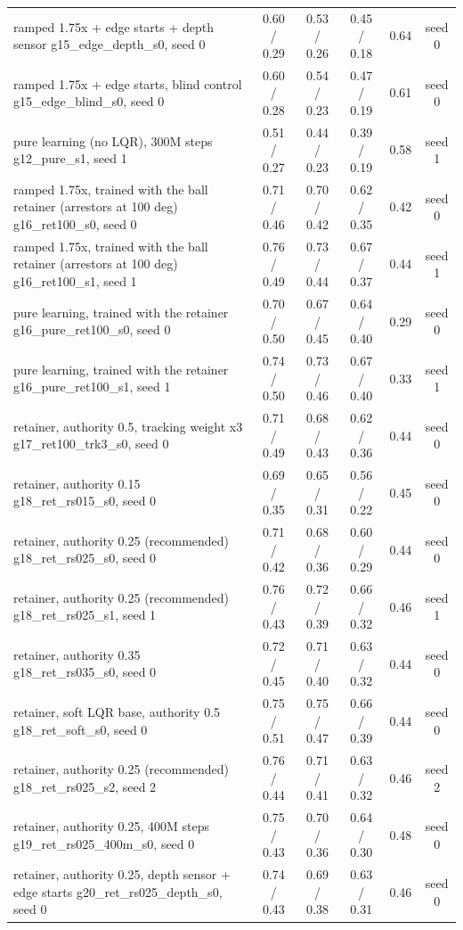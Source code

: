 \begin{table}[t]
{\begin{tabular}{lccccc}
ramped 1.75x + edge starts + depth sensor g15\_edge\_depth\_s0, seed 0 & 0.60 / 0.29 & 0.53 / 0.26 & 0.45 / 0.18 & 0.64 & seed 0\\
ramped 1.75x + edge starts, blind control g15\_edge\_blind\_s0, seed 0 & 0.60 / 0.28 & 0.54 / 0.23 & 0.47 / 0.19 & 0.61 & seed 0\\
pure learning (no LQR), 300M steps g12\_pure\_s1, seed 1 & 0.51 / 0.27 & 0.44 / 0.23 & 0.39 / 0.19 & 0.58 & seed 1\\
ramped 1.75x, trained with the ball retainer (arrestors at 100 deg) g16\_ret100\_s0, seed 0 & 0.71 / 0.46 & 0.70 / 0.42 & 0.62 / 0.35 & 0.42 & seed 0\\
ramped 1.75x, trained with the ball retainer (arrestors at 100 deg) g16\_ret100\_s1, seed 1 & 0.76 / 0.49 & 0.73 / 0.44 & 0.67 / 0.37 & 0.44 & seed 1\\
pure learning, trained with the retainer g16\_pure\_ret100\_s0, seed 0 & 0.70 / 0.50 & 0.67 / 0.45 & 0.64 / 0.40 & 0.29 & seed 0\\
pure learning, trained with the retainer g16\_pure\_ret100\_s1, seed 1 & 0.74 / 0.50 & 0.73 / 0.46 & 0.67 / 0.40 & 0.33 & seed 1\\
retainer, authority 0.5, tracking weight x3 g17\_ret100\_trk3\_s0, seed 0 & 0.71 / 0.49 & 0.68 / 0.43 & 0.62 / 0.36 & 0.44 & seed 0\\
retainer, authority 0.15 g18\_ret\_rs015\_s0, seed 0 & 0.69 / 0.35 & 0.65 / 0.31 & 0.56 / 0.22 & 0.45 & seed 0\\
retainer, authority 0.25 (recommended) g18\_ret\_rs025\_s0, seed 0 & 0.71 / 0.42 & 0.68 / 0.36 & 0.60 / 0.29 & 0.44 & seed 0\\
retainer, authority 0.25 (recommended) g18\_ret\_rs025\_s1, seed 1 & 0.76 / 0.43 & 0.72 / 0.39 & 0.66 / 0.32 & 0.46 & seed 1\\
retainer, authority 0.35 g18\_ret\_rs035\_s0, seed 0 & 0.72 / 0.45 & 0.71 / 0.40 & 0.63 / 0.32 & 0.44 & seed 0\\
retainer, soft LQR base, authority 0.5 g18\_ret\_soft\_s0, seed 0 & 0.75 / 0.51 & 0.75 / 0.47 & 0.66 / 0.39 & 0.44 & seed 0\\
retainer, authority 0.25 (recommended) g18\_ret\_rs025\_s2, seed 2 & 0.76 / 0.44 & 0.71 / 0.41 & 0.63 / 0.32 & 0.46 & seed 2\\
retainer, authority 0.25, 400M steps g19\_ret\_rs025\_400m\_s0, seed 0 & 0.75 / 0.43 & 0.70 / 0.36 & 0.64 / 0.30 & 0.48 & seed 0\\
retainer, authority 0.25, depth sensor + edge starts g20\_ret\_rs025\_depth\_s0, seed 0 & 0.74 / 0.43 & 0.69 / 0.38 & 0.63 / 0.31 & 0.46 & seed 0\\

\end{tabular}}
\end{table}
